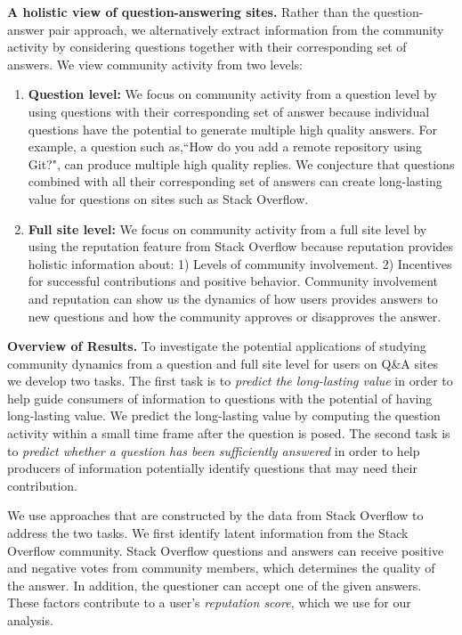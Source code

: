 \noindent\textbf{A holistic view of question-answering sites.} Rather than the question-answer pair approach, we alternatively extract information from the community activity by considering questions together with their corresponding set of answers. We view community activity from two levels: 
\begin{enumerate} 
\item \textbf{Question level:} We focus on community activity from a question level by using questions with their corresponding set of answer because individual questions have the potential to generate multiple high quality answers. For example, a question such as,``How do you add a remote repository using Git?", can produce multiple high quality replies. We conjecture that questions combined with all their corresponding set of answers can create long-lasting value for questions on sites such as Stack Overflow.
\item \textbf{Full site level:} We focus on community activity from a full site level by using the reputation feature from Stack Overflow because reputation provides holistic information about: 1) Levels of community involvement. 2) Incentives for successful contributions and positive behavior. Community involvement and reputation can show us the dynamics of how users provides answers to new questions and how the community approves or disapproves the answer.
\end{enumerate}


\noindent\textbf{Overview of Results.} To investigate the potential applications of studying community dynamics from a question and full site level for users on Q\&A sites we develop two tasks. The first task is to \textit{predict the long-lasting value} in order to help guide consumers of information to questions with the potential of having long-lasting value. We predict the long-lasting value by computing the question activity within a small time frame after the question is posed. The second task is to \textit{predict whether a question has been sufficiently answered} in order to help producers of information potentially identify questions that may need their contribution. 


We use approaches that are constructed by the data from Stack Overflow to address the two tasks. We first identify latent information from the Stack Overflow community. Stack Overflow questions and answers can receive positive and negative votes from community members, which determines the quality of the answer. In addition, the questioner can accept one of the given answers. These factors contribute to a user's \textit{reputation score}, which we use for our analysis.


